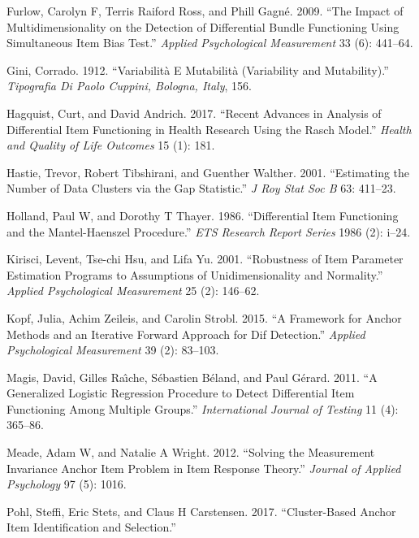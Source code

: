 \documentclass[
  11pt,
]{article}
\begin{document}
\leavevmode\hypertarget{ref-furlow2009impact}{}%
Furlow, Carolyn F, Terris Raiford Ross, and Phill Gagné. 2009. ``The Impact of Multidimensionality on the Detection of Differential Bundle Functioning Using Simultaneous Item Bias Test.'' \emph{Applied Psychological Measurement} 33 (6): 441--64.

\leavevmode\hypertarget{ref-gini1912variabilita}{}%
Gini, Corrado. 1912. ``Variabilità E Mutabilità (Variability and Mutability).'' \emph{Tipografia Di Paolo Cuppini, Bologna, Italy}, 156.

\leavevmode\hypertarget{ref-hagquist2017recent}{}%
Hagquist, Curt, and David Andrich. 2017. ``Recent Advances in Analysis of Differential Item Functioning in Health Research Using the Rasch Model.'' \emph{Health and Quality of Life Outcomes} 15 (1): 181.

\leavevmode\hypertarget{ref-hastie2001estimating}{}%
Hastie, Trevor, Robert Tibshirani, and Guenther Walther. 2001. ``Estimating the Number of Data Clusters via the Gap Statistic.'' \emph{J Roy Stat Soc B} 63: 411--23.

\leavevmode\hypertarget{ref-holland1986differential}{}%
Holland, Paul W, and Dorothy T Thayer. 1986. ``Differential Item Functioning and the Mantel-Haenszel Procedure.'' \emph{ETS Research Report Series} 1986 (2): i--24.

\leavevmode\hypertarget{ref-kirisci2001robustness}{}%
Kirisci, Levent, Tse-chi Hsu, and Lifa Yu. 2001. ``Robustness of Item Parameter Estimation Programs to Assumptions of Unidimensionality and Normality.'' \emph{Applied Psychological Measurement} 25 (2): 146--62.

\leavevmode\hypertarget{ref-kopf2015framework}{}%
Kopf, Julia, Achim Zeileis, and Carolin Strobl. 2015. ``A Framework for Anchor Methods and an Iterative Forward Approach for Dif Detection.'' \emph{Applied Psychological Measurement} 39 (2): 83--103.

\leavevmode\hypertarget{ref-magis2011generalized}{}%
Magis, David, Gilles Raı̂che, Sébastien Béland, and Paul Gérard. 2011. ``A Generalized Logistic Regression Procedure to Detect Differential Item Functioning Among Multiple Groups.'' \emph{International Journal of Testing} 11 (4): 365--86.

\leavevmode\hypertarget{ref-meade2012solving}{}%
Meade, Adam W, and Natalie A Wright. 2012. ``Solving the Measurement Invariance Anchor Item Problem in Item Response Theory.'' \emph{Journal of Applied Psychology} 97 (5): 1016.

\leavevmode\hypertarget{ref-pohl2017cluster}{}%
Pohl, Steffi, Eric Stets, and Claus H Carstensen. 2017. ``Cluster-Based Anchor Item Identification and Selection.''
\end{document}
